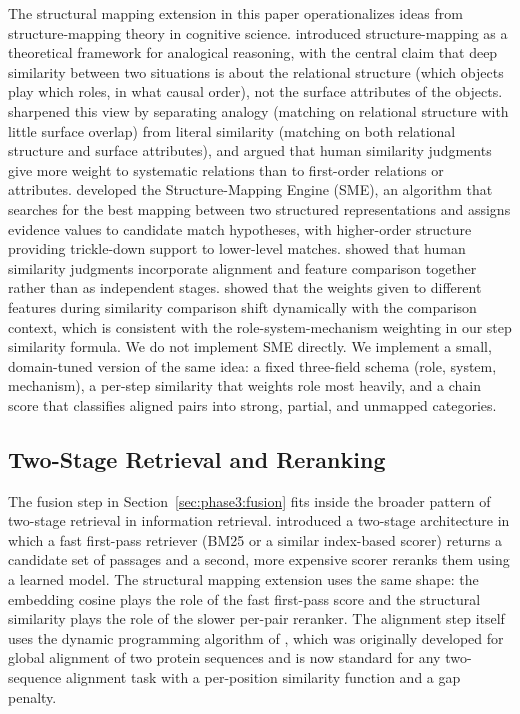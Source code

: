 \documentclass[11pt]{article}
\begin{document}
The structural mapping extension in this paper operationalizes ideas from structure-mapping theory in cognitive science. \citet{Gentner1983} introduced structure-mapping as a theoretical framework for analogical reasoning, with the central claim that deep similarity between two situations is about the relational structure (which objects play which roles, in what causal order), not the surface attributes of the objects. \citet{GentnerMarkman1997} sharpened this view by separating analogy (matching on relational structure with little surface overlap) from literal similarity (matching on both relational structure and surface attributes), and argued that human similarity judgments give more weight to systematic relations than to first-order relations or attributes. \citet{FalkenhainerForbusGentner1989} developed the Structure-Mapping Engine (SME), an algorithm that searches for the best mapping between two structured representations and assigns evidence values to candidate match hypotheses, with higher-order structure providing trickle-down support to lower-level matches. \citet{Goldstone1994} showed that human similarity judgments incorporate alignment and feature comparison together rather than as independent stages. \citet{SpencerSmithGoldstone1997} showed that the weights given to different features during similarity comparison shift dynamically with the comparison context, which is consistent with the role-system-mechanism weighting in our step similarity formula. We do not implement SME directly. We implement a small, domain-tuned version of the same idea: a fixed three-field schema (role, system, mechanism), a per-step similarity that weights role most heavily, and a chain score that classifies aligned pairs into strong, partial, and unmapped categories.

\subsection{Two-Stage Retrieval and Reranking}
\label{sec:related:reranking}

The fusion step in Section~\ref{sec:phase3:fusion} fits inside the broader pattern of two-stage retrieval in information retrieval. \citet{NogueiraCho2019} introduced a two-stage architecture in which a fast first-pass retriever (BM25 or a similar index-based scorer) returns a candidate set of passages and a second, more expensive scorer reranks them using a learned model. The structural mapping extension uses the same shape: the embedding cosine plays the role of the fast first-pass score and the structural similarity plays the role of the slower per-pair reranker. The alignment step itself uses the dynamic programming algorithm of \citet{NeedlemanWunsch1970}, which was originally developed for global alignment of two protein sequences and is now standard for any two-sequence alignment task with a per-position similarity function and a gap penalty.
\end{document}
